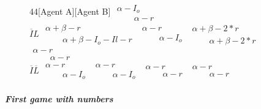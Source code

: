 \documentclass[10.5pt]{article}
\begin{document}
\begin{figure}[ h!]
\begin{center}
\begin{footnotesize}
\begin{game}{4}{4}[Agent A][Agent B]
							  \> $\begin{array}{l}\alpha-I_{o} \\[0.0mm]\phantom{--}\alpha-r \end{array}$
							  \\$\overline{I}L$   
							  \> $\begin{array}{l}\alpha+\beta-r \\[0.0mm]\phantom{--}\alpha+\beta-I_{o}-I{l}-r \end{array}$
							  \> $\begin{array}{l}\alpha-r \\[0.0mm]\phantom{--}\alpha-I_{o} \end{array}$ 
							  \> $\begin{array}{l}\alpha+\beta-2*r \\[0.0mm]\phantom{--}\alpha+\beta-2*r \end{array}$
							  \> $\begin{array}{l}\alpha-r \\[0.0mm]\phantom{--}\alpha-r \end{array}$
							\\$\overline{I}\overline{L}$ 
							 \> $\begin{array}{l}\alpha-r \\[0.0mm]\phantom{--}\alpha-I_{o}\end{array}$
							 \> $\begin{array}{l}\alpha-r \\[0.0mm]\phantom{--}\alpha-I_{o}\end{array}$
							 \> $\begin{array}{l}\alpha-r \\[0.0mm]\phantom{--}\alpha-r \end{array}$
							 \>$\begin{array}{l}\alpha-r \\[0.0mm]\phantom{--}\alpha-r \end{array}$
							  \\
\end{game}
\end{footnotesize}
\end{center}
\end{figure}
\subparagraph{First game with numbers}
\end{document}
